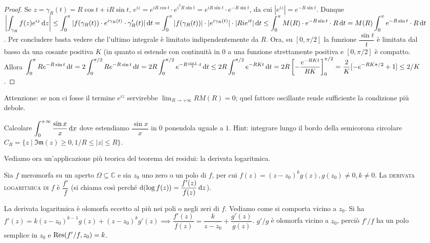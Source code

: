 \begin{proof}
  Se $z=\gamma_R(t)=R\cos{t}+iR\sin{t}$, $e^{iz}=e^{iR\cos{t}}\cdot e^{i^2R\sin{t}}=e^{iR\sin{t}}\cdot e^{-R\sin{t}}$, da cui $|e^{iz}|=e^{-R\sin{t}}$.
  Dunque $\displaystyle \left| \int_{\gamma_R} f(z)e^{iz}\mathop{}\!\mathrm{d} z\right| \le \int_0^\pi | f(\gamma_R(t))\cdot e^{i\gamma_R(t)}\cdot \gamma_R'(t)|\mathop{}\!\mathrm{d} t=\int_0^\pi |f(\gamma_R(t))|\cdot |e^{i\gamma_R(t)}|\cdot |Ri e^{it}| \mathop{}\!\mathrm{d} t \le \int_0^\pi M(R) \cdot e^{-R\sin{t}} \cdot R \mathop{}\!\mathrm{d} t=M(R)\int_0^\pi e^{-R\sin{t}}\cdot R \mathop{}\!\mathrm{d} t$.
  Per concludere basta vedere che l'ultimo integrale è limitato indipendentemente da $R$. Ora, su $[0,\pi/2]$ la funzione $\dfrac{\sin{t}}{t}$ è limitata dal basso da una cosante positiva $K$ (in quanto si estende con continuità in $0$ a una funzione strettamente positiva e $[0,\pi/2]$ è compatto. Allora $\displaystyle \int_0^\pi Re^{-R\sin{t}} \mathop{}\!\mathrm{d} t=2 \int_0^{\pi/2} Re^{-R\sin{t}}\mathop{}\!\mathrm{d} t=2R \int_0^{\pi/2} e^{-R\frac{\sin{t}}{t}\cdot t} \mathop{}\!\mathrm{d} t \le 2R \int_0^{\pi/2} e^{-RKt}\mathop{}\!\mathrm{d} t=2R\left[-\frac{e^{-RKt}}{RK}\right]_0^{\pi/2}=\frac{2}{K}[-e^{-RK\pi/2}+1] \le 2/K$.
\end{proof}

Attenzione: se non ci fosse il termine $e^{iz}$ servirebbe $\displaystyle \lim_{R \longrightarrow +\infty} RM(R)=0$; quel fattore oscillante rende sufficiente la condizione più debole. \marginpar\warningsign

\begin{exc}
  Calcolare $\displaystyle \int_0^{+\infty} \frac{\sin{x}}{x} \mathop{}\!\mathrm{d} x$ dove estendiamo $\dfrac{\sin{x}}{x}$ in $0$ ponendola uguale a $1$. Hint: integrare lungo il bordo della semicorona circolare $C_R=\{z \mid \mathfrak{Im}(z) \ge 0, 1/R \le |z| \le R\}$.
\end{exc}

Vediamo ora un'applicazione più teorica del teorema dei residui: la derivata logaritmica.

\begin{defn}
  Sia $f$ meromorfa su un aperto $\Omega \subseteq \mathbb{C}$ e sia $z_0$ uno zero o un polo di $f$, per cui $f(z)=(z-z_0)^kg(z), g(z_0)\not=0, k\not=0$. La \textsc{derivata logaritmica di $f$} è $\dfrac{f'}{f}$ (si chiama così perché $\mathop{}\!\mathrm{d}(\log{f(z)})=\dfrac{f'(z)}{f(z)}\mathop{}\!\mathrm{d} z$).
\end{defn}

La derivata logaritmica è olomorfa eccetto al più nei poli o negli zeri di $f$. Vediamo come si comporta vicino a $z_0$. Si ha $f'(z)=k(z-z_0)^{k-1}g(z)+(z-z_0)^kg'(z) \implies \dfrac{f'(z)}{f(z)}=\dfrac{k}{z-z_0}+\dfrac{g'(z)}{g(z)}$. $g'/g$ è olomorfa vicino a $z_0$, perciò $f'/f$ ha un polo semplice in $z_0$ e $\text{Res}(f'/f, z_0)=k$.


